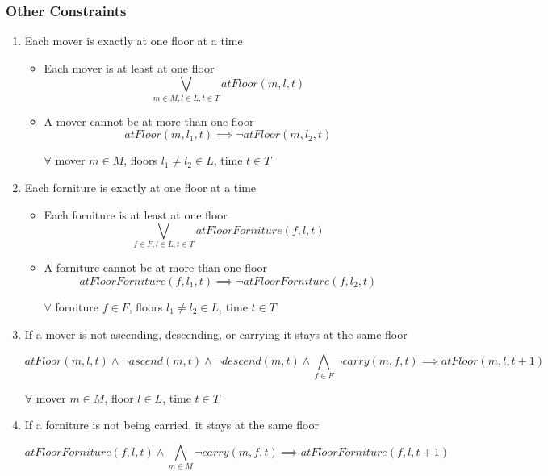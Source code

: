 \documentclass[a4paper, 11pt]{article}
\begin{document}
\subsubsection{Other Constraints}

\begin{enumerate}
	\item Each mover is exactly at one floor at a time

	      \begin{itemize}
		      \item Each mover is at least at one floor
		            $$ \bigvee_{m \in M, l \in L, t\in T} atFloor(m, l, t) $$

		      \item A mover cannot be at more than one floor
		            $$ atFloor(m, l_1, t) \implies \lnot atFloor(m, l_2, t) $$

		            $\forall$ mover $m \in M$, floors $l_1 \neq l_2 \in L$, time $t \in T$
	      \end{itemize}

	\item Each forniture is exactly at one floor at a time

	      \begin{itemize}
		      \item Each forniture is at least at one floor
		            $$ \bigvee_{f \in F, l \in L, t\in T} atFloorForniture(f, l, t) $$

		      \item A forniture cannot be at more than one floor
		            $$ atFloorForniture(f, l_1, t) \implies \lnot atFloorForniture(f, l_2, t) $$

		            $\forall$ forniture $f \in F$, floors $l_1 \neq l_2 \in L$, time $t \in T$
	      \end{itemize}

	\item If a mover is not ascending, descending, or carrying it stays at the same floor

	      $$atFloor(m,l,t) \land \lnot ascend(m, t) \land \lnot descend(m, t) \land \bigwedge_{f \in F} \lnot carry(m, f, t) \implies atFloor(m,l, t+1) $$

	      $\forall$ mover $m \in M$, floor $l \in L$, time $t \in T$

	\item If a forniture is not being carried, it stays at the same floor

	      $$atFloorForniture(f, l, t) \land \bigwedge_{m \in M} \lnot carry(m, f, t) \implies atFloorForniture(f, l, t + 1)$$


\end{enumerate}
\end{document}
